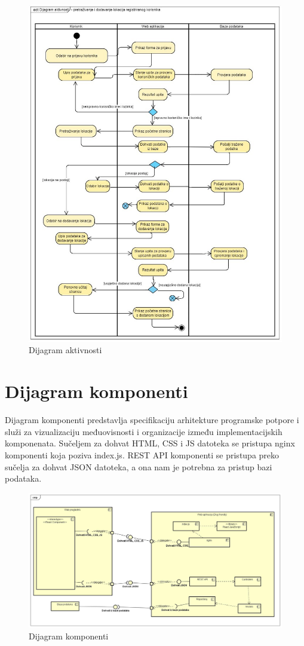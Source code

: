         \begin{figure}[H]
        	\includegraphics[width=\textwidth]{img/Dijagram aktivnosti.jpg}
        	\centering
        	\caption{Dijagram aktivnosti}
        	\label{fig:promjene}
        \end{figure}
    
    \section{Dijagram komponenti}

        Dijagram komponenti predstavlja specifikaciju arhitekture programske potpore i služi za vizualizaciju međuovisnosti i organizacije između implementacijskih komponenata. Sučeljem za dohvat HTML, CSS i JS datoteka se pristupa nginx komponenti koja poziva index.js. REST API komponenti se pristupa preko sučelja za dohvat JSON datoteka, a ona nam je potrebna za pristup bazi podataka.

        \begin{figure}[H]
        	\includegraphics[width=\textwidth]{img/Dijagram komponenti.jpg}
        	\centering
        	\caption{Dijagram komponenti}
        	\label{fig:promjene}
        \end{figure}
    